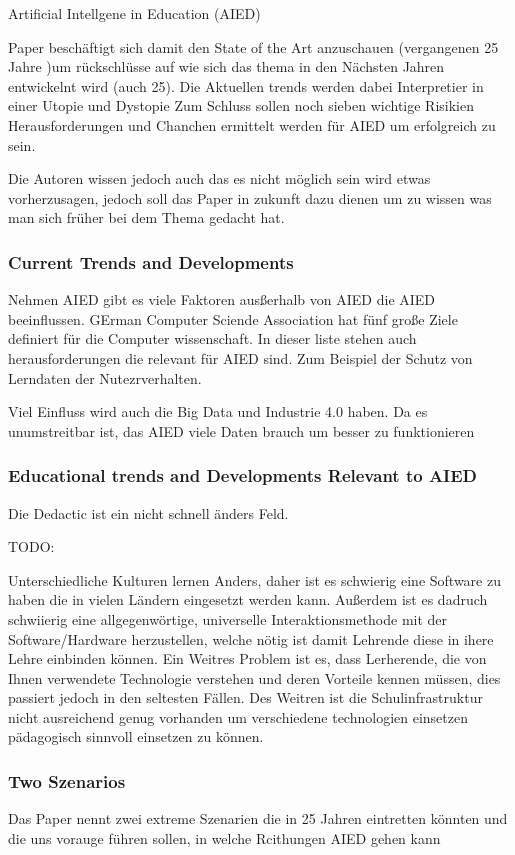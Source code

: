 Artificial Intellgene in Education (AIED)

Paper beschäftigt sich damit den State of the Art anzuschauen (vergangenen 25 Jahre )um rückschlüsse auf wie sich das
thema in den Nächsten Jahren entwickelnt wird (auch 25). Die Aktuellen trends werden dabei Interpretier in einer Utopie und Dystopie
Zum Schluss sollen noch sieben wichtige Risikien Herausforderungen und Chanchen ermittelt werden für AIED um erfolgreich zu sein.

Die Autoren wissen jedoch auch das es nicht möglich sein wird etwas vorherzusagen, jedoch soll das Paper in zukunft dazu dienen um zu wissen was man sich früher bei dem Thema gedacht hat.


\subsubsection*{Current Trends and Developments}

Nehmen AIED gibt es viele Faktoren ausßerhalb von AIED die AIED beeinflussen.
GErman Computer Sciende Association hat fünf große Ziele definiert für die Computer wissenschaft. In dieser
liste stehen auch herausforderungen die relevant für AIED sind. Zum Beispiel der Schutz von Lerndaten der Nutezrverhalten.

Viel Einfluss wird auch die Big Data und Industrie 4.0 haben. Da es unumstreitbar ist, das AIED viele Daten brauch um besser zu funktionieren

\subsubsection{Educational trends and Developments Relevant to AIED}
Die Dedactic ist ein nicht schnell änders Feld.

TODO:

Unterschiedliche Kulturen lernen Anders, daher ist es schwierig eine Software zu haben die in vielen Ländern eingesetzt werden kann.
Außerdem ist es dadruch schwiierig eine allgegenwörtige, universelle Interaktionsmethode mit der Software/Hardware herzustellen,
welche nötig ist damit Lehrende diese in ihere Lehre einbinden können. 
Ein Weitres Problem ist es, dass Lerherende, die von Ihnen verwendete Technologie verstehen und deren Vorteile kennen müssen,
dies passiert jedoch in den seltesten Fällen. Des Weitren ist die Schulinfrastruktur nicht ausreichend genug vorhanden um verschiedene technologien einsetzen pädagogisch sinnvoll einsetzen zu können.


\subsubsection{Two Szenarios}
Das Paper nennt zwei extreme Szenarien die in 25 Jahren eintretten könnten und die uns vorauge führen sollen, in welche Rcithungen AIED gehen kann
